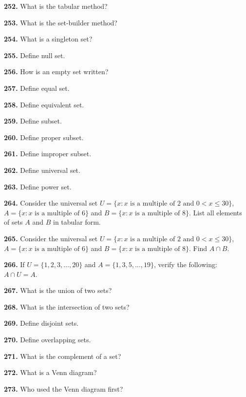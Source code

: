 \documentclass[11pt]{article}
\begin{document}
\bigskip
\noindent\textbf{252.} What is the tabular method?

\bigskip
\noindent\textbf{253.} What is the set-builder method?

\bigskip
\noindent\textbf{254.} What is a singleton set?

\bigskip
\noindent\textbf{255.} Define null set.

\bigskip
\noindent\textbf{256.} How is an empty set written?

\bigskip
\noindent\textbf{257.} Define equal set.

\bigskip
\noindent\textbf{258.} Define equivalent set.

\bigskip
\noindent\textbf{259.} Define subset.

\bigskip
\noindent\textbf{260.} Define proper subset.

\bigskip
\noindent\textbf{261.} Define improper subset.

\bigskip
\noindent\textbf{262.} Define universal set.

\bigskip
\noindent\textbf{263.} Define power set.

\bigskip
\noindent\textbf{264.} Consider the universal set $U=\{x: x \text{ is a multiple of } 2 \text{ and } 0<x\le 30\}$, $A=\{x: x \text{ is a multiple of } 6\}$ and $B=\{x: x \text{ is a multiple of } 8\}$. List all elements of sets $A$ and $B$ in tabular form.

\bigskip
\noindent\textbf{265.} Consider the universal set $U=\{x: x \text{ is a multiple of } 2 \text{ and } 0<x\le 30\}$, $A=\{x: x \text{ is a multiple of } 6\}$ and $B=\{x: x \text{ is a multiple of } 8\}$. Find $A\cap B$.

\bigskip
\noindent\textbf{266.} If $U=\{1,2,3,\ldots,20\}$ and $A=\{1,3,5,\ldots,19\}$, verify the following: $A\cap U=A$.

\bigskip
\noindent\textbf{267.} What is the union of two sets?

\bigskip
\noindent\textbf{268.} What is the intersection of two sets?

\bigskip
\noindent\textbf{269.} Define disjoint sets.

\bigskip
\noindent\textbf{270.} Define overlapping sets.

\bigskip
\noindent\textbf{271.} What is the complement of a set?

\bigskip
\noindent\textbf{272.} What is a Venn diagram?

\bigskip
\noindent\textbf{273.} Who used the Venn diagram first?
\end{document}
